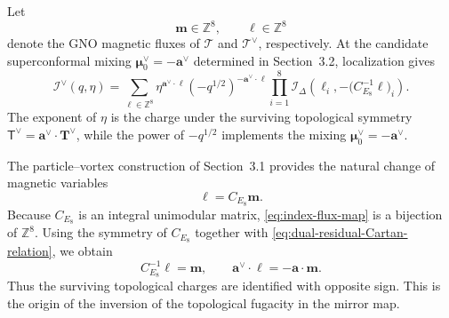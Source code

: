 \documentclass[11pt,a4paper]{article}
\numberwithin{equation}{section}
\begin{document}
Let
\begin{equation}
  \boldsymbol m\in\mathbb Z^8,
  \qquad
  \boldsymbol\ell\in\mathbb Z^8
  \label{eq:original-dual-flux-lattices}
\end{equation}
denote the GNO magnetic fluxes of $\mathcal T$ and $\mathcal T^\vee$, respectively.  At the candidate superconformal mixing $\boldsymbol\mu_0^\vee=-\boldsymbol a^\vee$ determined in Section~3.2, localization gives
\begin{equation}
  \mathcal I^\vee(q,\eta)
  =\sum_{\boldsymbol\ell\in\mathbb Z^8}
  \eta^{\boldsymbol a^\vee\cdot\boldsymbol\ell}
  \left(-q^{1/2}\right)^{-\boldsymbol a^\vee\cdot\boldsymbol\ell}
  \prod_{i=1}^{8}
  \mathcal I_\Delta\!\left(
    \ell_i,
    -\bigl(C_{E_8}^{-1}\boldsymbol\ell\bigr)_i
  \right).
  \label{eq:dual-full-SCI}
\end{equation}
The exponent of $\eta$ is the charge under the surviving topological symmetry $\mathsf T^\vee=\boldsymbol a^\vee\cdot\boldsymbol T^\vee$, while the power of $-q^{1/2}$ implements the mixing $\boldsymbol\mu_0^\vee=-\boldsymbol a^\vee$.

The particle--vortex construction of Section~3.1 provides the natural change of magnetic variables
\begin{equation}
  \boldsymbol\ell=C_{E_8}\boldsymbol m.
  \label{eq:index-flux-map}
\end{equation}
Because $C_{E_8}$ is an integral unimodular matrix, \eqref{eq:index-flux-map} is a bijection of $\mathbb Z^8$.  Using the symmetry of $C_{E_8}$ together with \eqref{eq:dual-residual-Cartan-relation}, we obtain
\begin{equation}
  C_{E_8}^{-1}\boldsymbol\ell=\boldsymbol m,
  \qquad
  \boldsymbol a^\vee\cdot\boldsymbol\ell
  =-\boldsymbol a\cdot\boldsymbol m.
  \label{eq:index-charge-map}
\end{equation}
Thus the surviving topological charges are identified with opposite sign.  This is the origin of the inversion of the topological fugacity in the mirror map.
\end{document}
